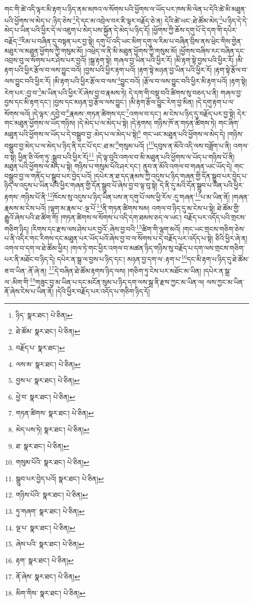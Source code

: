 གང་གི་ཚེ་འདི་ལྟར་མི་རྟག་པ་ཉིད་ནམ་མཁའ་ལ་སོགས་པའི་ཕྱོགས་ལ་ཡོད་པར་ཁས་མི་ལེན་པ་དེའི་ཚེ་མི་མཐུན་པའི་ཕྱོགས་ལ་མེད་པ་:ཉིད་ཅེས་\footnote{ཉིད་  སྣར་ཐང་།  པེ་ཅིན། }དེ་དང་མ་འབྲེལ་བར་ཇི་ལྟར་བརྗོད་ཅེ་ན། དེའི་ཚེ་ཡང་:ཐེ་ཚོམ་མེད་\footnote{ཐེ་ཚོམ་  སྣར་ཐང་།  པེ་ཅིན། }པ་ཉིད་དེ་དེ་མེད་པ་ཡིན་པའི་ཕྱིར་དེ་ལ་འཇུག་པ་མེད་པས་སྐྱོན་དེ་མེད་པ་ཉིད་དོ། །ཕྱོགས་ཀྱི་ཆོས་དགུ་པོ་དེ་དག་གི་དཔེར་བརྗོད་\footnote{བརྗོད་པ་  སྣར་ཐང་། }རིམ་པ་བཞིན་དུ་བསྟན་པར་བྱ་སྟེ། དགུ་པོ་འདི་ཡང་མིག་དགུ་ལ་རིམ་པ་བཞིན་བྲིས་ནས་ཕྲེང་གིས་གྱེན་མཐུར་ལ་མཐུན་ཕྱོགས་ཀྱི་གསུམ་མོ། །འཕྲེད་ལ་ནི་མི་མཐུན་ཕྱོགས་ཀྱི་གསུམ་མོ། །ཕྱོགས་བཞིས་རང་བཞིན་དང་འབྲས་བུ་ལ་སོགས་པར་ཤེས་པར་བྱའོ། །སྒྲ་རྟག་སྟེ། གཞལ་བྱ་ཡིན་པའི་ཕྱིར་རོ། །མི་རྟག་སྟེ་བྱས་པའི་ཕྱིར་རོ། །མི་རྟག་པའི་ཕྱིར་རྩོལ་བ་ལས་བྱུང་བའོ། །བྱས་པའི་ཕྱིར་རྟག་པའོ། །རྟག་སྟེ་མཉན་བྱ་ཡིན་པའི་ཕྱིར་རོ། །རྟག་སྟེ་རྩོལ་བ་ལས་བྱུང་བའི་ཕྱིར་རོ། །མི་རྟག་པའི་ཕྱིར་རྩོལ་བ་ལས་\footnote{ལས་མ་  སྣར་ཐང་།  པེ་ཅིན། }བྱུང་བའོ། །རྩོལ་བ་ལས་བྱུང་བའི་ཕྱིར་མི་རྟག་པའོ། །རྟག་སྟེ། རེག་པར་:བྱ་བ་\footnote{བྱས་པ་  སྣར་ཐང་།  པེ་ཅིན། }མ་ཡིན་པའི་ཕྱིར་རོ་ཞེས་བྱ་བ་རྣམས་ཏེ། དེ་དག་གི་བསྡུ་བའི་ཚིགས་སུ་བཅད་པ་ནི། གཞལ་བྱ་བྱས་དང་མི་རྟག་དང་། །བྱས་དང་མཉན་བྱ་རྩོལ་ལས་བྱུང་། །མི་རྟག་རྩོལ་བྱུང་རེག་བྱ་མིན། །དེ་དགུ་རྟག་པ་ལ་སོགས་ལའོ། །དེ་ལྟར་:དབྱེ་བ་\footnote{ཕྱེ་བ་  སྣར་ཐང་།  པེ་ཅིན། }རྣམས་:གཏན་ཚིགས་དང་\footnote{གཏན་ཚིགས་  སྣར་ཐང་།  པེ་ཅིན། }འགལ་བ་དང་། མ་ངེས་པ་ཉིད་དུ་བརྗོད་པར་བྱ་སྟེ། དེར་གང་མཐུན་ཕྱོགས་ལ་ཡོད་གཉིས། །དེ་མེད་པ་ལ་མེད་པ་སྟེ། །དེ་རྟགས། གཉིས་ཁོ་ན་གཏན་ཚིགས་ཏེ། གང་ཞིག་མཐུན་པའི་ཕྱོགས་ལ་ཡོད་པ་དེ་བསྒྲུབ་བྱ་:མེད་པ་ལ་མེད་པ་སྟེ།\footnote{མེད་པས་ཏེ།  སྣར་ཐང་།  པེ་ཅིན། } གང་ཡང་མཐུན་པའི་ཕྱོགས་ལ་མེད་དེ། །གཉིས་བསྒྲུབ་བྱ་མེད་པ་ལ་མེད་པ་ཉིད་ནི་དང་པོ་དང་:ཐ་མ་\footnote{ཐ་  སྣར་ཐང་།  པེ་ཅིན། }གསུམ་པའོ། །\footnote{གསུམ་པོའི་  སྣར་ཐང་།  པེ་ཅིན། }དབུས་ན་མོའི་འདི་ལས་བཟློག་པ་ནི། འགལ་བ་སྟེ། ཕྱིན་ཅི་ལོག་ཏུ་:སྒྲུབ་པའི་ཕྱིར་རོ།\footnote{སྒྲུབ་པར་བྱེད་པའོ།  སྣར་ཐང་།  པེ་ཅིན། } །དེ་ལྟ་བུའི་འགལ་བ་མི་མཐུན་པའི་ཕྱོགས་ལ་ཡོད་པ་གཉིས་པོ་ནི། མཐུན་པའི་ཕྱོགས་ལ་མེད་པ་སྟེ། གཉིས་པ་གསུམ་པོའི་ཤར་དང་། ནུབ་ན་མོའི་འགལ་བ་གཞན་ཡང་ཡོད་དེ། གང་བསྒྲུབ་བྱ་ལ་གནོད་པ་སྒྲུབ་པར་བྱེད་པའོ། །དཔེར་ན་ཐ་དད་རྣམས་ཀྱི་འདུས་པ་ཉིད་གཞན་གྱི་དོན་སྒྲུབ་པར་བྱེད་པ་ཉིད་ལ་འདུས་པ་ཡིན་པའི་ཕྱིར་གཞན་གྱི་དོན་སྒྲུབ་པོ་ཞེས་བྱ་བ་ལྟ་བུ་སྟེ། དེ་ནི་དུ་མའི་དོན་སྒྲུབ་པ་ཡིན་པའི་ཕྱིར་རྟགས་:གཉིས་པོ་ནི་\footnote{གཉིས་པོའི་  སྣར་ཐང་།  པེ་ཅིན། }ཁོངས་སུ་འདུས་པ་ཉིད་ཡིན་པས་ན་དགུ་པོ་ལས་ཕྱི་རོལ་:དུ་གཞན་\footnote{ཏུ་གཞག་  སྣར་ཐང་།  པེ་ཅིན། }པ་མ་ཡིན་ནོ། །གཞན་རྣམས་མ་ངེས་པའོ། །ལྷག་མ་རྣམ་པ་:ལྔ་པོ་\footnote{ལྔ་པ་  སྣར་ཐང་།  པེ་ཅིན། }ནི་གཏན་ཚིགས་སམ། འགལ་བ་ཉིད་དུ་མ་ངེས་པ་སྟེ། ཐེ་ཚོམ་གྱི་རྒྱུའོ་ཞེས་པའི་ཐ་ཚིག་གོ། །གཏན་ཚིགས་ལ་སོགས་པ་འདི་དག་ཐམས་ཅད་ལ་ཡང་། བརྗོད་པར་འདོད་པའི་གྲངས་གཅིག་ཉིད། །རིགས་དང་རྫས་ལས་ཤེས་པར་བྱའོ་:ཞེས་བྱ་བའི་\footnote{ཞེས་པའི་  སྣར་ཐང་།  པེ་ཅིན། }ཚིག་གི་ལྷག་མའོ། །གང་ཡང་གྲངས་གཅིག་ཅེས་པ་ནི་འདིར་གང་རིགས་དང་མཐུན་པར་ཡོད་པའོ་ཞེས་བྱ་བ་ལ་སོགས་པ་དེ་བརྗོད་པར་འདོད་པ་སྟེ། ཅིའི་ཕྱིར་ཞེ་ན། འགལ་བ་དག་ལ་ཐེ་ཚོམ་ཕྱིར། །གལ་ཏེ་གང་ཕྱིར་འགལ་བ་མཚན་ཉིད་གཉིས་སུ་བརྗོད་པ་དག་ལས་གྲངས་གཅིག་པར་ནི་མཐོང་བ་ཉིད་དེ། དཔེར་ན་སྒྲ་ལ་བྱས་པ་ཉིད་དང་། མཉན་བྱ་དག་ལ་:རྟག་པ་\footnote{རྟག་  སྣར་ཐང་།  པེ་ཅིན། }དང་མི་རྟག་པ་ཉིད་དུ་ཐེ་ཚོམ་ཟ་བ་ཡིན་:ནོ་ཞེ་ན། \footnote{ནོ་ཞེས་  སྣར་ཐང་།  པེ་ཅིན། }དེ་བཞིན་ཐེ་ཚོམ་རྟགས་ཉིད་ལས། །གཅིག་ཏུ་ངེས་པར་མཐོང་མ་ཡིན། །དཔེར་ན་སྒྲ་ལ་:མིག་གི་\footnote{མིག་གིས་  སྣར་ཐང་།  པེ་ཅིན། }གཟུང་བྱ་མ་ཡིན་པ་དང་མངོན་སུམ་པ་ཉིད་དག་ལས་སྒྲ་ནི་རྫས་ཀྱང་མ་ཡིན་ལ། ལས་ཀྱང་མ་ཡིན་ནོ་ཞེས་ངེས་པ་ཡིན་ནོ། །དེའི་ཕྱིར་བརྗོད་པར་འདོད་པ་གཅིག་ཉིད་དོ། 
